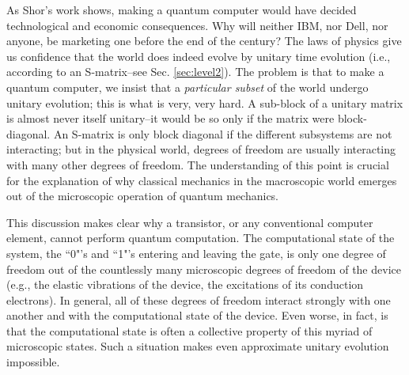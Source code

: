 As Shor's work shows,
making a quantum computer would have decided technological
and economic consequences.  Why will neither IBM, nor Dell, nor anyone,
be marketing one before the end of the century?  The laws of physics give us
confidence that the world does indeed evolve by unitary time evolution (i.e.,
according to an S-matrix--see Sec. \ref{sec:level2}).
The problem is that to make a quantum computer,
we insist that a {\em particular
subset} of the world undergo unitary evolution; this is what is very, very
hard.  A sub-block of a unitary matrix is almost never itself unitary--it would
be so only if the
matrix were block-diagonal.  An S-matrix is only block diagonal if
the different
subsystems are not interacting; but in the physical world, degrees of freedom
are usually interacting with many other degrees of freedom.  The understanding
of this point is crucial for the explanation of why classical mechanics in
the macroscopic world emerges out of the microscopic operation of quantum
mechanics.

This discussion makes clear why a transistor, or any conventional computer
element, cannot perform quantum computation.  The computational state of
the system, the ``0"'s and ``1"'s entering and leaving
the gate, is only one degree of freedom out
of the countlessly many microscopic degrees of freedom of the device (e.g.,
the elastic vibrations of the device, the excitations
of its conduction electrons).
In general, all of these degrees of freedom interact strongly with one another
and with the computational state of the device.
Even worse, in fact, is that the computational state is often a collective
property of this myriad of microscopic states.  Such a situation makes even
approximate unitary evolution impossible.

